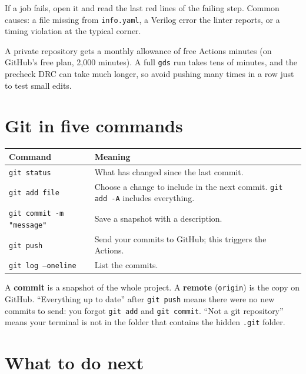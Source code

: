 \documentclass[11pt,a4paper]{article}
\newcommand{\file}[1]{\texttt{#1}}
\newcommand{\cmd}[1]{\texttt{#1}}
\begin{document}
If a job fails, open it and read the last red lines of the failing step. Common causes: a file missing from \file{info.yaml}, a Verilog error the linter reports, or a timing violation at the typical corner.

A private repository gets a monthly allowance of free Actions minutes (on GitHub's free plan, 2,000 minutes). A full \cmd{gds} run takes tens of minutes, and the precheck DRC can take much longer, so avoid pushing many times in a row just to test small edits.

\section{Git in five commands}

\begin{center}
\begin{tabularx}{\linewidth}{@{}lX@{}}
\toprule
Command & Meaning \\
\midrule
\cmd{git status} & What has changed since the last commit. \\
\cmd{git add file} & Choose a change to include in the next commit. \cmd{git add -A} includes everything. \\
\cmd{git commit -m "message"} & Save a snapshot with a description. \\
\cmd{git push} & Send your commits to GitHub; this triggers the Actions. \\
\cmd{git log --oneline} & List the commits. \\
\bottomrule
\end{tabularx}
\end{center}

A \textbf{commit} is a snapshot of the whole project. A \textbf{remote} (\texttt{origin}) is the copy on GitHub. ``Everything up to date'' after \cmd{git push} means there were no new commits to send: you forgot \cmd{git add} and \cmd{git commit}. ``Not a git repository'' means your terminal is not in the folder that contains the hidden \file{.git} folder.

\section{What to do next}
\end{document}

